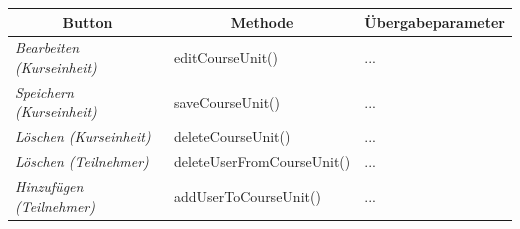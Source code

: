 \begin{itemize}
\begin{center}
\begin{longtable}{|p{4cm} |p{6cm} | p{4cm}|}
						\hline \multicolumn{1}{|c|}{\textbf{Button}} & \multicolumn{1}{|c|}{\textbf{Methode}} & \multicolumn{1}{|c|}{\textbf{\"{U}bergabeparameter}} \\ \hline
						\endfirsthead
						\hline
						\endlastfoot
						
							\textit{Bearbeiten (Kurseinheit) } & editCourseUnit() & ... \\ \hline
							\textit{Speichern (Kurseinheit) } & saveCourseUnit() & ... \\ \hline
							\textit{Löschen (Kurseinheit) } & deleteCourseUnit() & ... \\ \hline
							\textit{Löschen (Teilnehmer) } & deleteUserFromCourseUnit() & ... \\ \hline
							\textit{Hinzufügen (Teilnehmer) } & addUserToCourseUnit() & ... \\ \hline
					\end{longtable}
				\end{center}
				

\end{itemize}
